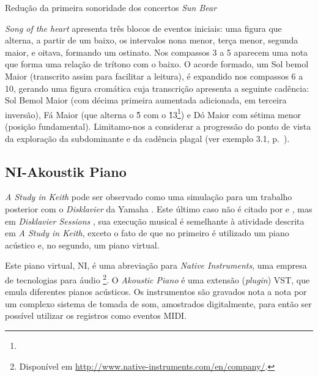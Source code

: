 \begin{example}{Redução da primeira sonoridade dos concertos \emph{Sun Bear}}\label{ex:schenker}


\emph{Song of the heart} apresenta três blocos de eventos iniciais: uma figura que alterna, a partir de um baixo, os intervalos nona menor, terça menor, segunda maior, e oitava, formando um ostinato. Nos compassos 3 a 5 aparecem uma nota que forma uma relação de trítono com o baixo. O acorde formado, um Sol bemol Maior (transcrito assim para facilitar a leitura), é expandido nos compassos 6 a 10, gerando uma figura cromática cuja transcrição apresenta a seguinte cadência: Sol Bemol Maior (com décima primeira aumentada adicionada, em terceira inversão), Fá Maior (que alterna o \^5 com o \^13\footnote{}) e Dó Maior com sétima menor (posição fundamental). Limitamo-nos a considerar a progressão do ponto de vista da exploração da subdominante e da cadência plagal (ver exemplo 3.1, p.~\pageref{ex:schenker}).  

\centering{}
\end{example}


\subsection{NI-Akoustik Piano}\label{sec:NI}

\emph{A Study in Keith} pode ser observado como uma simulação para um trabalho posterior com o \emph{Disklavier} da Yamaha . Este último caso não é citado por  e , mas em \emph{Disklavier Sessions} \cite{sorensen_disklavier_2013}, sua execução musical é semelhante à atividade descrita em \emph{A Study in Keith}, exceto o fato de que no primeiro é utilizado um piano acústico e, no segundo, um piano virtual.

Este piano virtual, NI, é uma abreviação para \emph{Native Instruments}, uma empresa de tecnologias para áudio \footnote{Disponível em \url{http://www.native-instruments.com/en/company/}.}. O \emph{Akoustic Piano} é uma extensão (\emph{plugin}) VST, que emula diferentes pianos acústicos. Os instrumentos são gravados nota a nota por um complexo sistema de tomada de som, amostrados digitalmente, para então ser possível utilizar os registros como eventos MIDI.


